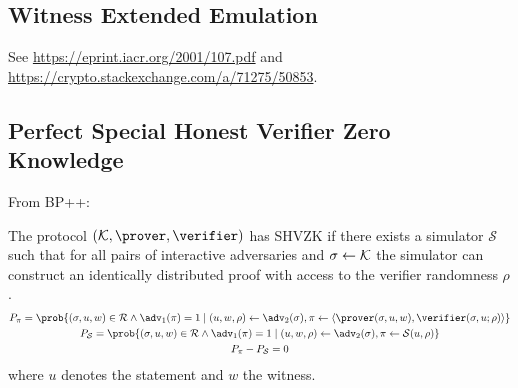 \subsection{Witness Extended Emulation}
See \url{https://eprint.iacr.org/2001/107.pdf} and \url{https://crypto.stackexchange.com/a/71275/50853}.

\subsection{Perfect Special Honest Verifier Zero Knowledge}
From BP++:

\begin{definition}
    The protocol $(\setup, \prover, \verifier)$ has SHVZK if there
    exists a simulator $\mathcal{S}$ such that for all pairs of interactive
    adversaries and $\sigma \gets \mathcal{K}$ the simulator can construct an identically distributed proof
    with access to the verifier randomness $\rho$.
    \begin{gather*}
    P_{\pi} =
        \prob{ (\sigma, u, w) \in \mathcal{R} \land \adv_1(\pi) = 1
        \mid %
             (u, w, \rho) \gets \adv_2(\sigma),
             \pi \gets \ip{\prover(\sigma, u, w)}{
                 \verifier(\sigma, u; \rho)} }
    \\
        P_{\mathcal{S}} =
        \prob{ (\sigma, u, w) \in \mathcal{R} \land \adv_1(\pi) = 1
        \mid %
             (u, w, \rho) \gets \adv_2(\sigma),
             \pi \gets \mathcal{S}(u, \rho) }
    \\
        P_{\pi} - P_{\mathcal{S}} = 0
    \end{gather*}
    where $u$ denotes the statement and $w$ the witness.
\end{definition}